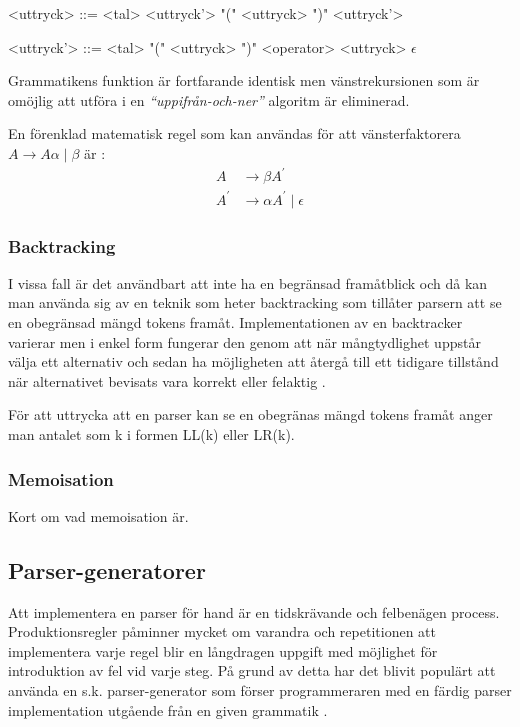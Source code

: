 \setlength{\grammarindent}{5em}
\begin{grammar}
  \singlespace\small%
  \selectfont
  <uttryck> ::= <tal> <uttryck'>
    \alt "(" <uttryck> ")" <uttryck'>

  <uttryck'> ::= <tal>
    \alt "(" <uttryck> ")"
    \alt <operator> <uttryck>
    \alt $\epsilon$
\end{grammar}

Grammatikens funktion är fortfarande identisk men vänstrekursionen som är
omöjlig att utföra i en \textit{``uppifrån-och-ner''} algoritm är eliminerad.

En förenklad matematisk regel som kan användas för att vänsterfaktorera
$A \rightarrow A\alpha\;|\;\beta$ är \citep[s. 212]{aa06}:
\begin{align*}
A &\rightarrow \beta A^\prime \\
A^\prime &\rightarrow \alpha A^\prime\;|\;\epsilon
\end{align*}

\subsubsection{Backtracking}

I vissa fall är det användbart att inte ha en begränsad framåtblick och då kan
man använda sig av en teknik som heter backtracking som tillåter parsern att
se en obegränsad mängd tokens framåt. Implementationen av en backtracker
varierar men i enkel form fungerar den genom att när mångtydlighet uppstår
välja ett alternativ och sedan ha möjligheten att återgå till ett tidigare
tillstånd när alternativet bevisats vara korrekt eller felaktig \citep[s. 55]{pt10}.

För att uttrycka att en parser kan se en obegränas mängd tokens framåt anger
man antalet som k i formen LL(k) eller LR(k).

\subsubsection{Memoisation}

Kort om vad memoisation är.

\subsection{Parser-generatorer}

Att implementera en parser för hand är en tidskrävande och felbenägen process.
Produktionsregler påminner mycket om varandra och repetitionen att
implementera varje regel blir en långdragen uppgift med möjlighet för
introduktion av fel vid varje steg. På grund av detta har det blivit populärt
att använda en s.k. parser-generator som förser programmeraren med en färdig
parser implementation utgående från en given grammatik \citep[s. 26]{pt10}.

